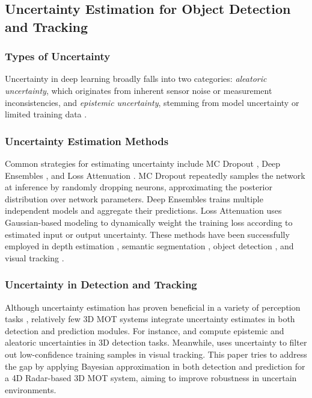 \subsection{Uncertainty Estimation for Object Detection and Tracking}
\label{sec:sec2b}

\subsubsection{Types of Uncertainty}
Uncertainty in deep learning broadly falls into two categories: \emph{aleatoric uncertainty}, which originates from inherent sensor noise or measurement inconsistencies, and \emph{epistemic uncertainty}, stemming from model uncertainty or limited training data \cite{lossattenuation}.

\subsubsection{Uncertainty Estimation Methods}
Common strategies for estimating uncertainty include MC Dropout \cite{mcdropout}, Deep Ensembles \cite{deepensemble}, and Loss Attenuation \cite{lossattenuation}. 
MC Dropout repeatedly samples the network at inference by randomly dropping neurons, approximating the posterior distribution over network parameters. Deep Ensembles trains multiple independent models and aggregate their predictions. Loss Attenuation uses Gaussian-based modeling to dynamically weight the training loss according to estimated input or output uncertainty. These methods have been successfully employed in depth estimation \cite{depth}, semantic segmentation \cite{stochasticseg}, object detection \cite{lidaruncertainty,griduncertainty}, and visual tracking \cite{trackuncertainty}.

\subsubsection{Uncertainty in Detection and Tracking}
Although uncertainty estimation has proven beneficial in a variety of perception tasks \cite{reviewuncertainty}, relatively few 3D MOT systems integrate uncertainty estimates in both detection and prediction modules. For instance, \cite{lidaruncertainty} and \cite{griduncertainty} compute epistemic and aleatoric uncertainties in 3D detection tasks. Meanwhile, \cite{trackuncertainty} uses uncertainty to filter out low-confidence training samples in visual tracking. This paper tries to address the gap by applying Bayesian approximation in both detection and prediction for a 4D Radar-based 3D MOT system, aiming to improve robustness in uncertain environments.